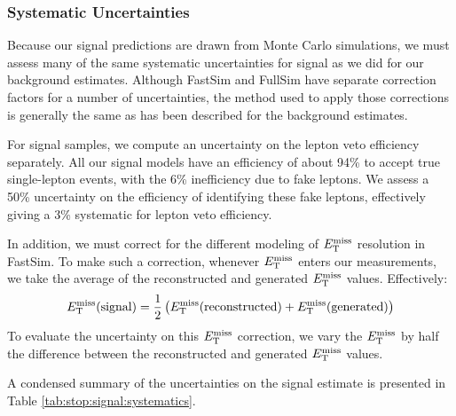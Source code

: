 \subsubsection{Systematic Uncertainties}
\label{sssec:stop:signal:systematics}

Because our signal predictions are drawn from Monte Carlo simulations,
we must assess many of the same systematic uncertainties for signal as
we did for our background estimates. Although FastSim and FullSim have
separate correction factors for a number of uncertainties, the method
used to apply those corrections is generally the same as has been
described for the background estimates.

For signal samples, we compute an uncertainty on the lepton veto
efficiency separately. All our signal models have an efficiency of
about 94\% to accept true single-lepton events, with the 6\%
inefficiency due to fake leptons. We assess a 50\% uncertainty on the
efficiency of identifying these fake leptons, effectively giving a 3\%
systematic for lepton veto efficiency.

In addition, we must correct for the different modeling of $E_\text{T}^\text{miss}$ resolution %
in FastSim. To make such a correction, whenever $E_\text{T}^\text{miss}$ enters our
measurements, we take the average of the reconstructed and generated
$E_\text{T}^\text{miss}$ values. Effectively:
\begin{equation}
E_\text{T}^\text{miss} \text{(signal)} = \frac{1}{2} \left( E_\text{T}^\text{miss} \text{(reconstructed)} + E_\text{T}^\text{miss}
  \text{(generated)} \right)
\end{equation}
To evaluate the uncertainty on this $E_\text{T}^\text{miss}$ correction, we vary the
$E_\text{T}^\text{miss}$ by half the difference between the reconstructed and generated
$E_\text{T}^\text{miss}$ values. %

A condensed summary of the uncertainties on the signal estimate is
presented in Table \ref{tab:stop:signal:systematics}.

